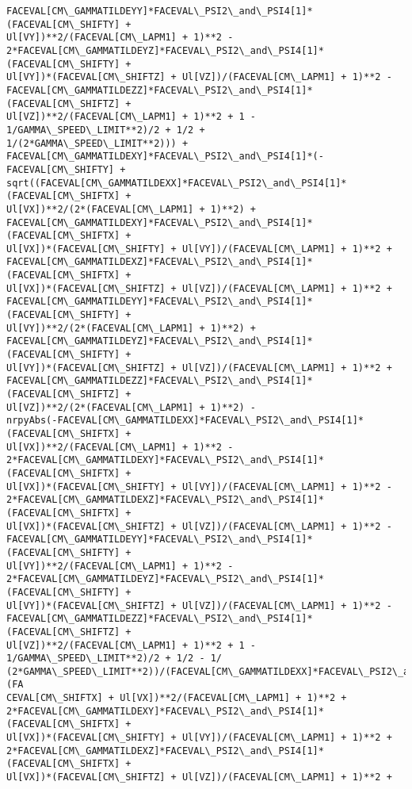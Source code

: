 \documentclass[landscape,letterpaper,10pt,english]{article}
\begin{document}
\begin{Verbatim}[commandchars=\\\{\}]
FACEVAL[CM\_GAMMATILDEYY]*FACEVAL\_PSI2\_and\_PSI4[1]*(FACEVAL[CM\_SHIFTY] +
Ul[VY])**2/(FACEVAL[CM\_LAPM1] + 1)**2 -
2*FACEVAL[CM\_GAMMATILDEYZ]*FACEVAL\_PSI2\_and\_PSI4[1]*(FACEVAL[CM\_SHIFTY] +
Ul[VY])*(FACEVAL[CM\_SHIFTZ] + Ul[VZ])/(FACEVAL[CM\_LAPM1] + 1)**2 -
FACEVAL[CM\_GAMMATILDEZZ]*FACEVAL\_PSI2\_and\_PSI4[1]*(FACEVAL[CM\_SHIFTZ] +
Ul[VZ])**2/(FACEVAL[CM\_LAPM1] + 1)**2 + 1 - 1/GAMMA\_SPEED\_LIMIT**2)/2 + 1/2 +
1/(2*GAMMA\_SPEED\_LIMIT**2))) +
FACEVAL[CM\_GAMMATILDEXY]*FACEVAL\_PSI2\_and\_PSI4[1]*(-FACEVAL[CM\_SHIFTY] +
sqrt((FACEVAL[CM\_GAMMATILDEXX]*FACEVAL\_PSI2\_and\_PSI4[1]*(FACEVAL[CM\_SHIFTX] +
Ul[VX])**2/(2*(FACEVAL[CM\_LAPM1] + 1)**2) +
FACEVAL[CM\_GAMMATILDEXY]*FACEVAL\_PSI2\_and\_PSI4[1]*(FACEVAL[CM\_SHIFTX] +
Ul[VX])*(FACEVAL[CM\_SHIFTY] + Ul[VY])/(FACEVAL[CM\_LAPM1] + 1)**2 +
FACEVAL[CM\_GAMMATILDEXZ]*FACEVAL\_PSI2\_and\_PSI4[1]*(FACEVAL[CM\_SHIFTX] +
Ul[VX])*(FACEVAL[CM\_SHIFTZ] + Ul[VZ])/(FACEVAL[CM\_LAPM1] + 1)**2 +
FACEVAL[CM\_GAMMATILDEYY]*FACEVAL\_PSI2\_and\_PSI4[1]*(FACEVAL[CM\_SHIFTY] +
Ul[VY])**2/(2*(FACEVAL[CM\_LAPM1] + 1)**2) +
FACEVAL[CM\_GAMMATILDEYZ]*FACEVAL\_PSI2\_and\_PSI4[1]*(FACEVAL[CM\_SHIFTY] +
Ul[VY])*(FACEVAL[CM\_SHIFTZ] + Ul[VZ])/(FACEVAL[CM\_LAPM1] + 1)**2 +
FACEVAL[CM\_GAMMATILDEZZ]*FACEVAL\_PSI2\_and\_PSI4[1]*(FACEVAL[CM\_SHIFTZ] +
Ul[VZ])**2/(2*(FACEVAL[CM\_LAPM1] + 1)**2) -
nrpyAbs(-FACEVAL[CM\_GAMMATILDEXX]*FACEVAL\_PSI2\_and\_PSI4[1]*(FACEVAL[CM\_SHIFTX] +
Ul[VX])**2/(FACEVAL[CM\_LAPM1] + 1)**2 -
2*FACEVAL[CM\_GAMMATILDEXY]*FACEVAL\_PSI2\_and\_PSI4[1]*(FACEVAL[CM\_SHIFTX] +
Ul[VX])*(FACEVAL[CM\_SHIFTY] + Ul[VY])/(FACEVAL[CM\_LAPM1] + 1)**2 -
2*FACEVAL[CM\_GAMMATILDEXZ]*FACEVAL\_PSI2\_and\_PSI4[1]*(FACEVAL[CM\_SHIFTX] +
Ul[VX])*(FACEVAL[CM\_SHIFTZ] + Ul[VZ])/(FACEVAL[CM\_LAPM1] + 1)**2 -
FACEVAL[CM\_GAMMATILDEYY]*FACEVAL\_PSI2\_and\_PSI4[1]*(FACEVAL[CM\_SHIFTY] +
Ul[VY])**2/(FACEVAL[CM\_LAPM1] + 1)**2 -
2*FACEVAL[CM\_GAMMATILDEYZ]*FACEVAL\_PSI2\_and\_PSI4[1]*(FACEVAL[CM\_SHIFTY] +
Ul[VY])*(FACEVAL[CM\_SHIFTZ] + Ul[VZ])/(FACEVAL[CM\_LAPM1] + 1)**2 -
FACEVAL[CM\_GAMMATILDEZZ]*FACEVAL\_PSI2\_and\_PSI4[1]*(FACEVAL[CM\_SHIFTZ] +
Ul[VZ])**2/(FACEVAL[CM\_LAPM1] + 1)**2 + 1 - 1/GAMMA\_SPEED\_LIMIT**2)/2 + 1/2 - 1/
(2*GAMMA\_SPEED\_LIMIT**2))/(FACEVAL[CM\_GAMMATILDEXX]*FACEVAL\_PSI2\_and\_PSI4[1]*(FA
CEVAL[CM\_SHIFTX] + Ul[VX])**2/(FACEVAL[CM\_LAPM1] + 1)**2 +
2*FACEVAL[CM\_GAMMATILDEXY]*FACEVAL\_PSI2\_and\_PSI4[1]*(FACEVAL[CM\_SHIFTX] +
Ul[VX])*(FACEVAL[CM\_SHIFTY] + Ul[VY])/(FACEVAL[CM\_LAPM1] + 1)**2 +
2*FACEVAL[CM\_GAMMATILDEXZ]*FACEVAL\_PSI2\_and\_PSI4[1]*(FACEVAL[CM\_SHIFTX] +
Ul[VX])*(FACEVAL[CM\_SHIFTZ] + Ul[VZ])/(FACEVAL[CM\_LAPM1] + 1)**2 +

\end{Verbatim}
\end{document}
